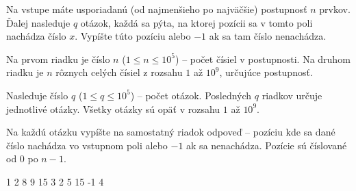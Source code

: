 




Na vstupe máte usporiadanú (od najmenšieho po najväčšie) postupnosť $n$ prvkov. Ďalej nasleduje $q$
otázok, každá sa pýta, na ktorej pozícii sa v tomto poli nachádza číslo $x$. Vypíšte túto pozíciu
alebo $-1$ ak sa tam číslo nenachádza.


Na prvom riadku je číslo $n$ ($1 \leq n \leq 10^5$) -- počet čísiel v postupnosti.
Na druhom riadku je $n$ rôznych celých čísiel z rozsahu $1$ až $10^9$, určujúce postupnosť.

Nasleduje číslo $q$ ($1 \leq q \leq 10^5$) -- počet otázok. Posledných $q$ riadkov určuje jednotlivé
otázky. Všetky otázky sú opäť v rozsahu $1$ až $10^9$.


Na každú otázku vypíšte na samostatný riadok odpoveď -- pozíciu kde sa dané číslo nachádza vo
vstupnom poli alebo $-1$ ak sa nenachádza. Pozície sú číslované od $0$ po $n-1$.


1 2 8 9 15
3
2
5
15
-1
4
\koniec


